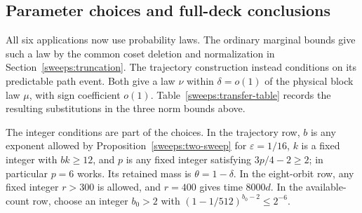 \subsection{Parameter choices and full-deck conclusions}\label{sweeps:assembly}
All six applications now use probability laws. The ordinary marginal
bounds give such a law by the common coset deletion and normalization
in Section~\ref{sweeps:truncation}. The trajectory construction instead
conditions on its predictable path event. Both give a law $\nu$ within
$\delta=o(1)$ of the physical block law $\mu$, with sign coefficient
$o(1)$. Table~\ref{sweeps:transfer-table} records the resulting
substitutions in the three norm bounds above.

The integer conditions are part of the choices. In the trajectory row,
$b$ is any exponent allowed by Proposition~\ref{sweeps:two-sweep} for
$\varepsilon=1/16$, $k$ is a fixed integer with $bk\ge12$, and $p$ is any fixed integer satisfying
$3p/4-2\ge2$; in particular $p=6$ works. Its retained mass is
$\theta=1-\delta$. In the eight-orbit row, any fixed integer $r>300$
is allowed, and $r=400$ gives time $8000d$. In the available-count row,
choose an integer $b_0>2$ with $(1-1/512)^{b_0-2}\le2^{-6}$.

